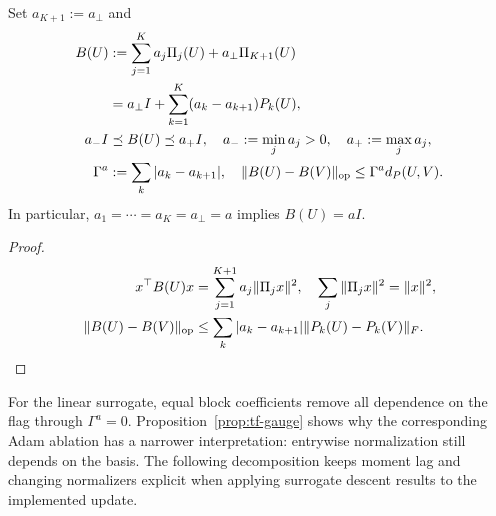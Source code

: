 \begin{proposition}\label{prop:tf-B}
Set $a_{K+1}:=a_\perp$ and
\begin{align}
 B(U)&:=\sum_{j=1}^Ka_j\Pi_j(U)+a_\perp\Pi_{K+1}(U)\\
 &=a_\perp I+\sum_{k=1}^K(a_k-a_{k+1})P_k(U),\\
 a_-I&\preceq B(U)\preceq a_+I,\quad
 a_-:=\min_j a_j>0,\quad a_+:=\max_j a_j,\\
 \Gamma^a&:=\sum_k|a_k-a_{k+1}|,\quad
 \|B(U)-B(V)\|_{\mathrm{op}}\le\Gamma^a d_P(U,V).
 \label{eq:tf-B-error}
\end{align}
In particular, $a_1=\cdots=a_K=a_\perp=a$ implies $B(U)=aI$.
\end{proposition}
\begin{proof}
\begin{align}
 x^\top B(U)x&=\sum_{j=1}^{K+1}a_j\|\Pi_jx\|^2,\quad
 \sum_j\|\Pi_jx\|^2=\|x\|^2,\\
 \|B(U)-B(V)\|_{\mathrm{op}}
 &\le\sum_k|a_k-a_{k+1}|\|P_k(U)-P_k(V)\|_F.
\end{align}
\end{proof}
For the linear surrogate, equal block coefficients remove all dependence on
the flag through $\Gamma^a=0$. Proposition~\ref{prop:tf-gauge} shows why the
corresponding Adam ablation has a narrower interpretation: entrywise
normalization still depends on the basis. The following decomposition keeps
moment lag and changing normalizers explicit when applying surrogate descent
results to the implemented update.

